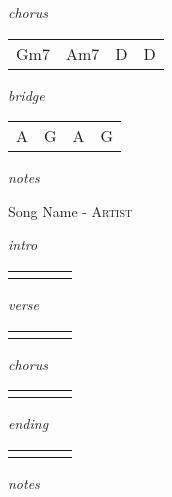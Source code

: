 \documentclass[12pt]{article}
\begin{document}
\textit{chorus}

\begin{tabular}{|P{1.25in}|P{1.25in}|P{1.25in}|P{1.25in}|}
  Gm7 & Am7  & D & D \\
\end{tabular}

\textit{bridge}

\begin{tabular}{|P{1.25in}|P{1.25in}|P{1.25in}|P{1.25in}|}
  A & G  &  A &  G \\
\end{tabular}

\textit{notes}

\newpage



{\Huge Song Name} {\huge - \textsc{Artist}}

\huge
\textit{intro}

\begin{tabular}{|P{1.25in}|P{1.25in}|P{1.25in}|P{1.25in}|}
    &   &   &   \\
\end{tabular}

\textit{verse}

\begin{tabular}{|P{1.25in}|P{1.25in}|P{1.25in}|P{1.25in}|}
    &   &   &   \\
\end{tabular}

\textit{chorus}

\begin{tabular}{|P{1.25in}|P{1.25in}|P{1.25in}|P{1.25in}|}
    &   &   &   \\
\end{tabular}

\textit{ending}

\begin{tabular}{|P{1.25in}|P{1.25in}|P{1.25in}|P{1.25in}|}
    &   &   &   \\
\end{tabular}

\textit{notes}

\newpage
\end{document}
